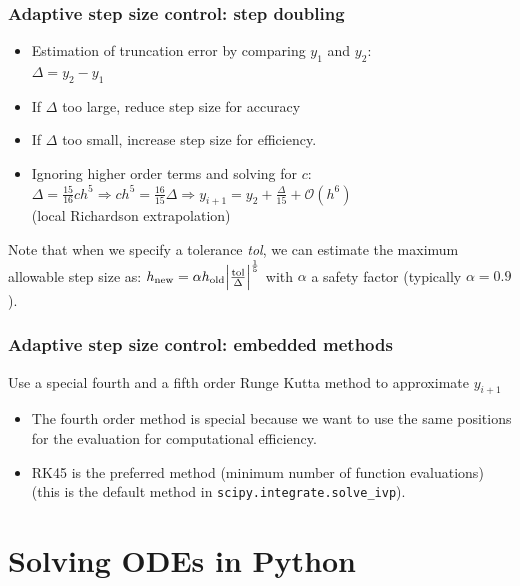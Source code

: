 \begin{frame}
  \frametitle{Adaptive step size control: step doubling}
\begin{itemize}
  \item Estimation of truncation error by comparing $y_1$ and $y_2$:\\
  $\Delta = y_2 - y_1$
  \item If $\Delta$ too large, reduce step size for accuracy
  \item If $\Delta$ too small, increase step size for efficiency.
  \item Ignoring higher order terms and solving for $c$:
  $ \Delta = \frac{15}{16}ch^5 \Rightarrow ch^5 = \frac{16}{15} \Delta \Rightarrow y_{i+1} = y_2 + \frac{\Delta}{15} + \mathcal{O}{(h^6)}$ \\ (local Richardson extrapolation)
\end{itemize}
  Note that when we specify a tolerance \emph{tol}, we can estimate the maximum allowable step size as:
  $ h_\text{new} = \alpha h_\text{old} \abs{\frac{\text{tol}}{\Delta}}^{\frac{1}{5}}$ with $\alpha$ a safety factor (typically $\alpha = 0.9$).
\end{frame}

\begin{frame}
  \frametitle{Adaptive step size control: embedded methods}
  Use a special fourth and a fifth order Runge Kutta method to approximate $y_{i+1}$
  \begin{itemize}
    \item The fourth order method is special because we want to use the same positions for the evaluation for computational efficiency.
    \item RK45 is the preferred method (minimum number of function evaluations) (this is the default method in \lstinline$scipy.integrate.solve_ivp$).
  \end{itemize}
\end{frame}

\section{Solving ODEs in Python}
